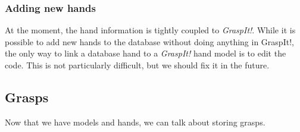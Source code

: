 \subsubsection{Adding new hands}
At the moment, the hand information is tightly coupled to
\emph{GraspIt!}. While it is possible to add new hands to the database
without doing anything in GraspIt!, the only way to link a database
hand to a \emph{GraspIt!} hand model is to edit the code. This is not
particularly difficult, but we should fix it in the future.



\subsection{Grasps}
Now that we have models and hands, we can talk about storing grasps.

